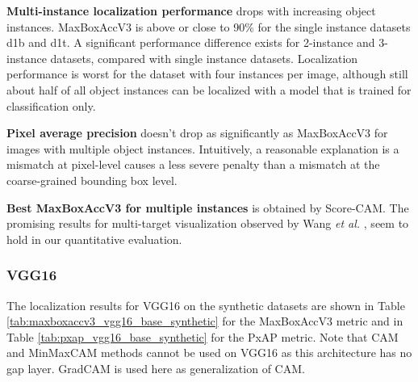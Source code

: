 \textbf{Multi-instance localization performance} drops with increasing object instances. MaxBoxAccV3 is above or close to 90\% for the single instance datasets d1b and d1t. A significant performance difference exists for 2-instance and 3-instance datasets, compared with single instance datasets. Localization performance is worst for the dataset with four instances per image, although still about half of all object instances can be localized with a model that is trained for classification only.

\textbf{Pixel average precision} doesn't drop as significantly as MaxBoxAccV3 for images with multiple object instances. Intuitively, a reasonable explanation is a mismatch at pixel-level causes a less severe penalty than a mismatch at the coarse-grained bounding box level.

\textbf{Best MaxBoxAccV3 for multiple instances} is obtained by Score-CAM. The promising results for multi-target visualization observed by Wang \textit{et al.} \cite{wang2020score}, seem to hold in our quantitative evaluation.

\subsubsection{VGG16}
The localization results for VGG16 on the synthetic datasets are shown in Table \ref{tab:maxboxaccv3_vgg16_base_synthetic} for the MaxBoxAccV3 metric and in Table \ref{tab:pxap_vgg16_base_synthetic} for the PxAP metric. Note that CAM and MinMaxCAM methods cannot be used on VGG16 as this architecture has no \acrshort{gap} layer. GradCAM is used here as generalization of CAM.

